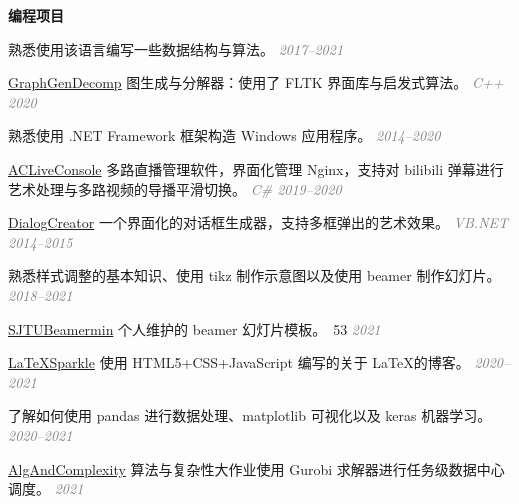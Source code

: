 \documentclass[a4paper]{article}
\newenvironment{cvitems}{
    \begin{justify}
    \begin{description}[
        labelwidth=1.8cm,
        leftmargin=2cm,
        parsep=0pt]
    
}{
    \end{description}
    \end{justify}
}
\newenvironment{githubs}{
    \begin{list}{\faGithubSquare}{
        \setlength{\topsep}{0pt}
        \setlength{\partopsep}{0pt}
        \setlength{\parsep}{0pt}
        \setlength{\itemsep}{0pt}}
}{
    \end{list}
}
\def\githublink#1{
    \href{https://github.com/LogCreative/#1}{\sffamily #1}
}
\def\section#1{
    \noindent\hskip2cm \textbf{\large #1} \hrulefill
}
\def\rightnote#1{
    \hfill\textcolor{gray}{\emph{#1}}
}
\begin{document}
    \section{编程项目}
    \begin{cvitems}
        \item[C/C++] 熟悉使用该语言编写一些数据结构与算法。 \rightnote{2017--2021}
        
        \begin{githubs}
            \item \githublink{GraphGenDecomp} 图生成与分解器：使用了 \textsf{FLTK} 界面库与启发式算法。 \rightnote{C++ 2020}
        \end{githubs}

        \item[VB{\scriptsize .NET}/C\#] 熟悉使用 \textsf{.NET Framework} 框架构造 Windows 应用程序。 \rightnote{2014--2020}
        
        \begin{githubs}
            \item \href{https://github.com/SJTU-Art-Center/ACLiveConsole}{\sffamily ACLiveConsole} 多路直播管理软件，界面化管理 Nginx，支持对 bilibili 弹幕进行艺术处理与多路视频的导播平滑切换。\rightnote{C\# 2019--2020}
            \item \githublink{DialogCreator} 一个界面化的对话框生成器，支持多框弹出的艺术效果。 \rightnote{VB{\scriptsize .NET} 2014--2015}
        \end{githubs}

        \item[\LaTeX] 熟悉样式调整的基本知识、使用 \textsf{tikz} 制作示意图以及使用 \textsf{beamer} 制作幻灯片。 \rightnote{2018--2021}
        
        \begin{githubs}
            \item \githublink{SJTUBeamermin} 个人维护的 \textsf{beamer} 幻灯片模板。\faStar\textsf{~53} \rightnote{2021}
            \item \githublink{LaTeXSparkle} 使用 \textsf{HTML5+CSS+JavaScript} 编写的关于 \LaTeX 的博客。\rightnote{2020--2021}
        \end{githubs}

        \item[Python] 了解如何使用 \textsf{pandas} 进行数据处理、\textsf{matplotlib} 可视化以及 \textsf{keras} 机器学习。 \rightnote{2020--2021}
        
        \begin{githubs}
            \item \githublink{AlgAndComplexity} 算法与复杂性大作业使用 \textsf{Gurobi} 求解器进行任务级数据中心调度。\rightnote{2021}
        \end{githubs}


\end{cvitems}
\end{document}

